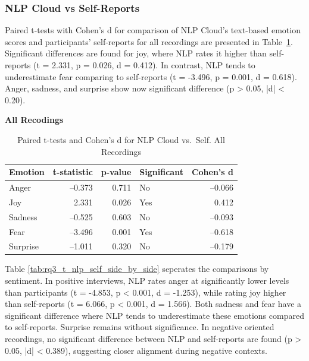 \subsubsection{NLP Cloud vs Self-Reports}
Paired t-tests with Cohen's d for comparison of NLP Cloud's text-based emotion scores and participants' self-reports for all recordings are presented in Table~\ref{tab:rq3_t_nlp_self_all}. 
Significant differences are found for joy, where NLP rates it higher than self-reports (t = 2.331, p = 0.026, d = 0.412). In contrast, NLP tends to underestimate fear comparing to self-reports (t = -3.496, p = 0.001, d = 0.618). 
Anger, sadness, and surprise show now significant difference (p > 0.05, |d| < 0.20).  
\begin{table}[H]
    \centering
    \caption*{\textbf{All Recodings}}
    \begin{tabular}{l r r l r}
      \toprule
      \textbf{Emotion} & \textbf{t-statistic} & \textbf{p-value} & \textbf{Significant} & \textbf{Cohen’s d} \\
      \midrule
      Anger    & –0.373 & 0.711 & No  & –0.066 \\
      Joy      &  2.331 & 0.026 & Yes &  0.412 \\
      Sadness  & –0.525 & 0.603 & No  & –0.093 \\
      Fear     & –3.496 & 0.001 & Yes & –0.618 \\
      Surprise & –1.011 & 0.320 & No  & –0.179 \\
      \bottomrule
    \end{tabular}
    \caption{Paired t-tests and Cohen's d for NLP Cloud vs.\ Self. All Recordings}
    \label{tab:rq3_t_nlp_self_all}
  \end{table}
  
Table \ref{tab:rq3_t_nlp_self_side_by_side} seperates the comparisons by sentiment. In positive interviews, NLP rates anger at significantly lower levels than participants (t = -4.853, p < 0.001, d = -1.253), while rating 
joy higher than self-reports (t = 6.066, p < 0.001, d = 1.566). Both sadness and fear have a significant difference where NLP tends to underestimate these emotions compared to self-reports. Surprise remains without significance. 
In negative oriented recordings, no significant difference between NLP and self-reports are found (p > 0.05, |d| < 0.389), suggesting closer alignment during negative contexts. 

